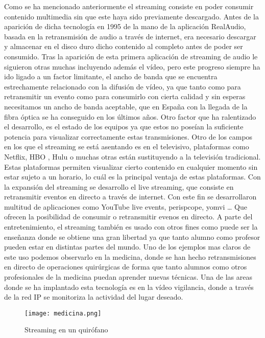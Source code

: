 Como se ha mencionado anteriormente el streaming consiste en poder consumir contenido multimedia sin que este haya sido previamente descargado. Antes de la aparición de dicha tecnología en 1995 de la mano de la aplicación RealAudio, basada en la retransmisión de audio a través de internet, era necesario descargar y almacenar en el disco duro dicho contenido al completo antes de poder ser consumido.
Tras la aparición de esta primera aplicación de streaming de audio le siguieron otras muchas incluyendo además el vídeo, pero este progreso siempre ha ido ligado a un factor limitante, el ancho de banda que se encuentra estrechamente relacionado con la difusión de vídeo, ya que tanto como para retransmitir un evento como para consumirlo con cierta calidad y sin esperas necesitamos un ancho de banda aceptable, que en España con la llegada de la fibra óptica se ha conseguido en los últimos años. Otro factor que ha ralentizado el desarrollo, es el estado de los equipos ya que estos no poseían la suficiente potencia para visualizar correctamente estas transmisiones.
Otro de los campos en los que el streaming se está asentando es en el televisivo, plataformas como Netflix, HBO , Hulu o muchas otras están sustituyendo a la televisión tradicional. Estas plataformas permiten visualizar cierto contenido en cualquier momento sin estar sujeto a un horario, lo cuál es la principal ventaja de estas plataformas.
Con la expansión del streaming se desarrollo el live streaming, que consiste en retransmitir eventos en directo a través de internet. Con este fin se desarrollaron multitud de aplicaciones como YouTube live events, perispcope, yomvi … Que ofrecen la posibilidad de consumir o retransmitir evenos en directo.
A parte del entretenimiento, el streaming también es usado con otros fines como puede ser la enseñanza donde se obtiene una gran libertad ya que tanto alumno como profesor pueden estar en distintas partes del mundo. Uno de los ejemplos mas claros de este uso podemos observarlo en la medicina, donde se han hecho retransmisiones en directo de operaciones quirúrgicas de forma que tanto alumnos como otros profesionales de la medicina puedan aprender nuevas técnicas. Una de las areas donde se ha implantado esta tecnología es en la vídeo vigilancia, donde a través de la red IP se monitoriza la actividad del lugar deseado.


\begin{figure}[H]
    \centering
    \texttt{[image: medicina.png]}
    \caption{Streaming en un quirófano}
\end{figure}


